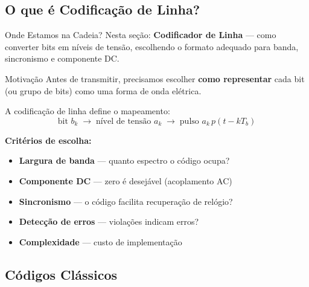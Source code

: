 
\subsection{O que é Codificação de Linha?}

\begin{frame}{Onde Estamos na Cadeia?}
  \vspace{0.1cm}
  {\small Nesta seção: \textbf{Codificador de Linha} — como converter
  bits em níveis de tensão, escolhendo o formato adequado para
  banda, sincronismo e componente DC.}
\end{frame}

\begin{frame}{Motivação}
  Antes de transmitir, precisamos escolher \textbf{como representar}
  cada bit (ou grupo de bits) como uma forma de onda elétrica.

  \vspace{0.3cm}
  A \alert{codificação de linha} define o mapeamento:
  \[
    \text{bit } b_k \;\longrightarrow\; \text{nível de tensão } a_k
    \;\longrightarrow\; \text{pulso } a_k\, p(t - kT_b)
  \]

  \vspace{0.3cm}
  \textbf{Critérios de escolha:}
  \begin{itemize}
    \item \textbf{Largura de banda} — quanto espectro o código ocupa?
    \item \textbf{Componente DC} — zero é desejável (acoplamento AC)
    \item \textbf{Sincronismo} — o código facilita recuperação de relógio?
    \item \textbf{Detecção de erros} — violações indicam erros?
    \item \textbf{Complexidade} — custo de implementação
  \end{itemize}
\end{frame}

\subsection{Códigos Clássicos}

